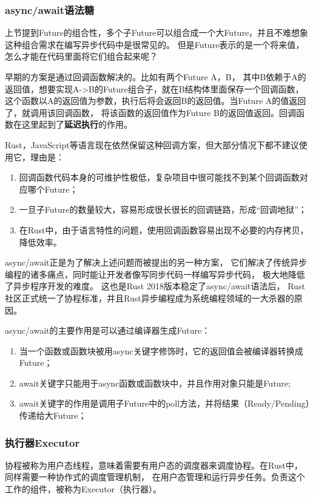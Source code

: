\documentclass[supercite]{HustGraduPaper}
\theoremstyle{definition}
\begin{document}
\subsubsection{async/await语法糖}
上节提到Future的组合性，多个子Future可以组合成一个大Future，并且不难想象这种组合需求在编写异步代码中是很常见的。
但是Future表示的是一个将来值，怎么才能在代码里面将它们组合起来呢？\par

早期的方案是通过回调函数解决的。比如有两个Future A，B，
其中B依赖于A的返回值，想要实现A->B的Future组合子，就在B结构体里面保存一个回调函数，
这个函数以A的返回值为参数，执行后将会返回B的返回值。当Future A的值返回了，就调用该回调函数，
将该函数的返回值作为Future B的返回值返回。回调函数在这里起到了\textbf{延迟执行}的作用。\par

Rust，JavaScript等语言现在依然保留这种回调方案，但大部分情况下都不建议使用它，理由是：
\begin{enumerate}[label={(\arabic*)}]
  \item 回调函数代码本身的可维护性极低，复杂项目中很可能找不到某个回调函数对应哪个Future；
  \item 一旦子Future的数量较大，容易形成很长很长的回调链路，形成“回调地狱”；
  \item 在Rust中，由于语言特性的问题，使用回调函数容易出现不必要的内存拷贝，降低效率。
\end{enumerate}

async/await正是为了解决上述问题而被提出的另一种方案，
它们解决了传统异步编程的诸多痛点，同时能让开发者像写同步代码一样编写异步代码，
极大地降低了异步程序开发的难度。
这也是Rust 2018版本稳定了async/await语法后，
Rust社区正式统一了协程标准，并且Rust异步编程成为系统编程领域的一大杀器的原因。

async/await的主要作用是可以通过编译器生成Future：
\begin{enumerate}[label={(\arabic*)}]
  \item 当一个函数或函数块被用async关键字修饰时，它的返回值会被编译器转换成Future；
  \item await关键字只能用于async函数或函数块中，并且作用对象只能是Future;
  \item await关键字的作用是调用子Future中的poll方法，并将结果（Ready/Pending）传递给大Future；
\end{enumerate}

\subsubsection{执行器Executor}
协程被称为用户态线程，意味着需要有用户态的调度器来调度协程。在Rust中，同样需要一种协作式的调度管理机制，
在用户态管理和运行异步任务。负责这个工作的组件，被称为Executor（执行器）。\par
\end{document}

